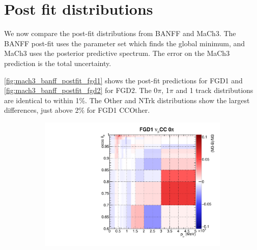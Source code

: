 \section{Post fit distributions}
We now compare the post-fit \pmu distributions from BANFF and MaCh3. The BANFF post-fit uses the parameter set which finds the global minimum, and MaCh3 uses the posterior predictive spectrum. The error on the MaCh3 prediction is the total uncertainty.

\autoref{fig:mach3_banff_postfit_fgd1} shows the post-fit predictions for FGD1 and \autoref{fig:mach3_banff_postfit_fgd2} for FGD2. The 0$\pi$, 1$\pi$ and 1 track distributions are identical to within 1\%. The Other and NTrk distributions show the largest differences, just above 2\% for FGD1 CCOther.
\begin{figure}
	\begin{subfigure}[t]{0.10\textwidth}
		\includegraphics[width=\textwidth, trim={0mm 0mm 0mm 0mm}, clip, page=2]{figures/mach3/banff/postfit_comp}
	\end{subfigure}
	

\end{figure}
